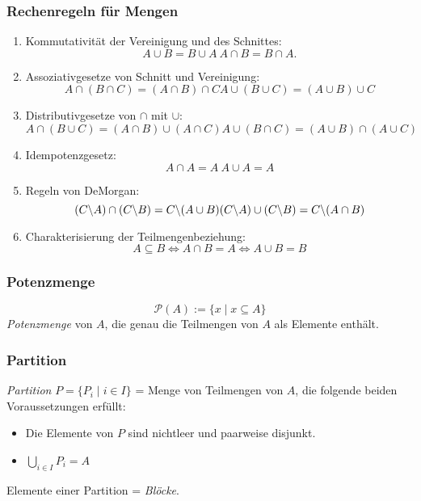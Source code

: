 \subsubsection{Rechenregeln für Mengen}%
\label{ssub:rechenregeln_für_mengen}
\begin{minipage}{0.9\linewidth}
\begin{enumerate}
 \item Kommutativität der Vereinigung und des Schnittes:
\[
 A\cup B=B\cup A\
 A\cap B=B\cap A.
\]
 \item Assoziativgesetze von Schnitt und Vereinigung:
\[
 A\cap(B\cap C)=(A\cap B)\cap C
 A\cup(B\cup C)=(A\cup B)\cup C
\]
 \item Distributivgesetze von $\cap$ mit $\cup$:
\[
 A\cap(B\cup C)=(A\cap B)\cup (A\cap C)
 A\cup(B\cap C)=(A\cup B)\cap (A\cup C)
\]
 \item Idempotenzgesetz:
\[
  A\cap A=A\
  A\cup A=A
\]
 \item Regeln von DeMorgan:
\[
 (C\backslash A)\cap (C\backslash B)=C\backslash (A\cup B)\\
 (C\backslash A)\cup (C\backslash B)=C\backslash (A\cap B)
\]
 \item Charakterisierung der Teilmengenbeziehung:
\[
 A\subseteq B\Leftrightarrow A\cap B= A\Leftrightarrow A\cup B=B
\]
\end{enumerate}
\end{minipage}

\subsubsection{Potenzmenge}%
\label{ssub:potenzmenge}
\begin{minipage}{0.9\linewidth}
\[
 \mathcal{P}(A):=\{x\mid x\subseteq A\}
\]
\textit{Potenzmenge} von $A$, die genau die Teilmengen von $A$ als Elemente enthält.
\end{minipage}

\subsubsection{Partition}%
\label{ssub:partition}
\begin{minipage}{0.9\linewidth}
\textit{Partition} $P=\{P_i\mid i\in I \}$ = Menge von Teilmengen von $A$, die folgende beiden Voraussetzungen erfüllt:
\begin{itemize}
 \item Die Elemente von $P$ sind nichtleer und paarweise disjunkt.
 \item $\bigcup_{i\in I}P_i=A$
\end{itemize}
Elemente einer Partition = \textit{Blöcke}.
\end{minipage}

